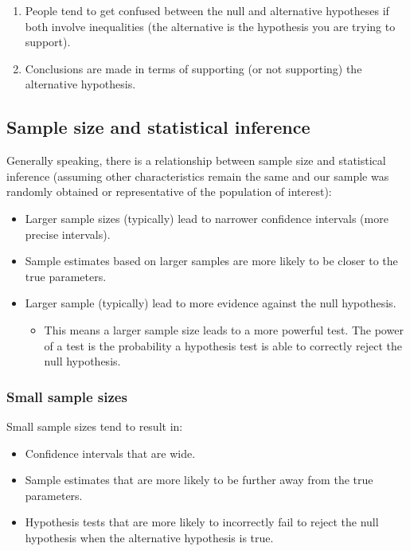 \documentclass[
]{book}
\providecommand{\tightlist}{%
  \setlength{\itemsep}{0pt}\setlength{\parskip}{0pt}}
\begin{document}
\begin{enumerate}
\def\labelenumi{\arabic{enumi}.}
\setcounter{enumi}{1}
\tightlist
\item
  People tend to get confused between the null and alternative hypotheses if both involve inequalities (the alternative is the hypothesis you are trying to support).
\item
  Conclusions are made in terms of supporting (or not supporting) the alternative hypothesis.
\end{enumerate}

\subsection{Sample size and statistical inference}\label{sample-size-and-statistical-inference}

Generally speaking, there is a relationship between sample size and statistical inference (assuming other characteristics remain the same and our sample was randomly obtained or representative of the population of interest):

\begin{itemize}
\tightlist
\item
  Larger sample sizes (typically) lead to narrower confidence intervals (more precise intervals).
\item
  Sample estimates based on larger samples are more likely to be closer to the true parameters.
\item
  Larger sample (typically) lead to more evidence against the null hypothesis.

  \begin{itemize}
  \tightlist
  \item
    This means a larger sample size leads to a more powerful test. The power of a test is the probability a hypothesis test is able to correctly reject the null hypothesis.
  \end{itemize}
\end{itemize}

\subsubsection{Small sample sizes}\label{small-sample-sizes}

Small sample sizes tend to result in:

\begin{itemize}
\tightlist
\item
  Confidence intervals that are wide.
\item
  Sample estimates that are more likely to be further away from the true parameters.
\item
  Hypothesis tests that are more likely to incorrectly fail to reject the null hypothesis when the alternative hypothesis is true.
\end{itemize}
\end{document}
